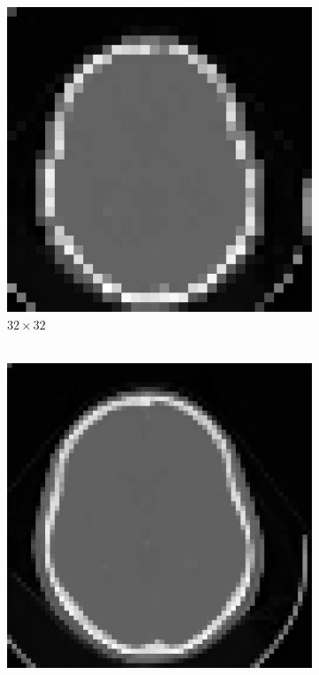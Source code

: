 \documentclass[letterpaper,12pt]{article}
\theoremstyle{plain}
\begin{document}
\begin{figure}[h]
\begin{subfigure}[h]{0.24\linewidth}
        \end{subfigure}
         \begin{subfigure}[h]{0.24\linewidth}
            \centering
            \includegraphics[width=\textwidth]{Figuras/Interpolate_bilinear_f=0.25.png}
            \caption{$32\times32$ \\
            $~$} 
         \end{subfigure}
         \begin{subfigure}[h]{0.24\linewidth}
            \centering
            \includegraphics[width=\textwidth]{Figuras/Interpolate_bilinear_f=0.5.png}

\end{subfigure}
\end{figure}
\end{document}
